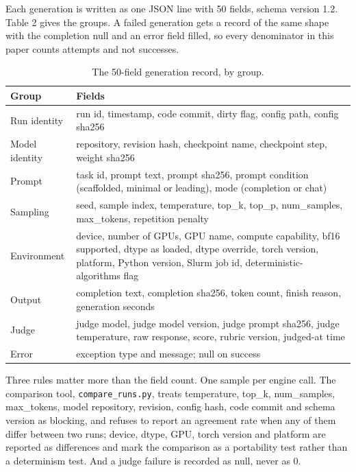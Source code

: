\documentclass[reprint,prx,amsmath,amssymb,aps,superscriptaddress]{revtex4-2}
\begin{document}
Each generation is written as one JSON line with 50 fields, schema version 1.2. Table 2 gives the groups. A failed generation gets a record of the same shape with the completion null and an error field filled, so every denominator in this paper counts attempts and not successes.

\begin{table}[t]
\caption{The 50-field generation record, by group.}
\begin{ruledtabular}
\begin{tabular}{ll}
Group & Fields \\
\hline
Run identity & run id, timestamp, code commit, dirty flag, config path, config sha256 \\
Model identity & repository, revision hash, checkpoint name, checkpoint step, weight sha256 \\
Prompt & task id, prompt text, prompt sha256, prompt condition (scaffolded, minimal or leading), mode (completion or chat) \\
Sampling & seed, sample index, temperature, top\_k, top\_p, num\_samples, max\_tokens, repetition penalty \\
Environment & device, number of GPUs, GPU name, compute capability, bf16 supported, dtype as loaded, dtype override, torch version, platform, Python version, Slurm job id, deterministic-algorithms flag \\
Output & completion text, completion sha256, token count, finish reason, generation seconds \\
Judge & judge model, judge model version, judge prompt sha256, judge temperature, raw response, score, rubric version, judged-at time \\
Error & exception type and message; null on success \\
\end{tabular}
\end{ruledtabular}
\end{table}

Three rules matter more than the field count. One sample per engine call. The comparison tool, \texttt{compare\_runs.py}, treats temperature, top\_k, num\_samples, max\_tokens, model repository, revision, config hash, code commit and schema version as blocking, and refuses to report an agreement rate when any of them differ between two runs; device, dtype, GPU, torch version and platform are reported as differences and mark the comparison as a portability test rather than a determinism test. And a judge failure is recorded as null, never as 0.
\end{document}
